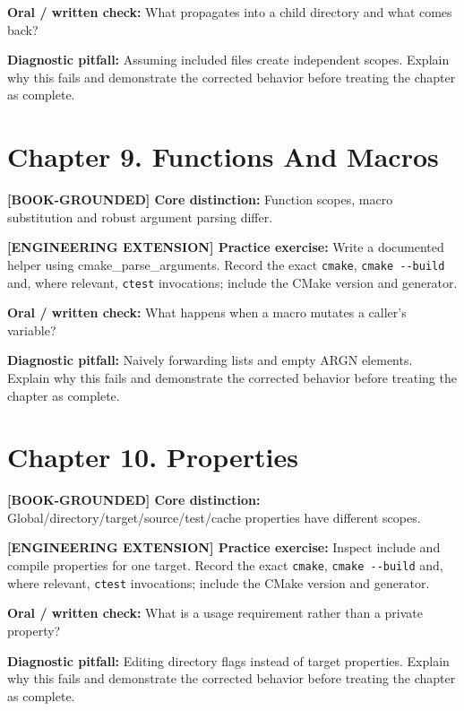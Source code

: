 \documentclass[11pt,letterpaper,oneside]{report}
\providecommand{\passthrough}[1]{#1}
\begin{document}
\textbf{Oral / written check:} What propagates into a child directory
and what comes back?

\textbf{Diagnostic pitfall:} Assuming included files create independent
scopes. Explain why this fails and demonstrate the corrected behavior
before treating the chapter as complete.

\section{Chapter 9. Functions And
Macros}\label{chapter-9.-functions-and-macros}

\textbf{{[}BOOK-GROUNDED{]} Core distinction:} Function scopes, macro
substitution and robust argument parsing differ.

\textbf{{[}ENGINEERING EXTENSION{]} Practice exercise:} Write a
documented helper using cmake\_parse\_arguments. Record the exact
\passthrough{\lstinline!cmake!}, \passthrough{\lstinline!cmake --build!}
and, where relevant, \passthrough{\lstinline!ctest!} invocations;
include the CMake version and generator.

\textbf{Oral / written check:} What happens when a macro mutates a
caller's variable?

\textbf{Diagnostic pitfall:} Naively forwarding lists and empty ARGN
elements. Explain why this fails and demonstrate the corrected behavior
before treating the chapter as complete.

\section{Chapter 10. Properties}\label{chapter-10.-properties}

\textbf{{[}BOOK-GROUNDED{]} Core distinction:}
Global/directory/target/source/test/cache properties have different
scopes.

\textbf{{[}ENGINEERING EXTENSION{]} Practice exercise:} Inspect include
and compile properties for one target. Record the exact
\passthrough{\lstinline!cmake!}, \passthrough{\lstinline!cmake --build!}
and, where relevant, \passthrough{\lstinline!ctest!} invocations;
include the CMake version and generator.

\textbf{Oral / written check:} What is a usage requirement rather than a
private property?

\textbf{Diagnostic pitfall:} Editing directory flags instead of target
properties. Explain why this fails and demonstrate the corrected
behavior before treating the chapter as complete.
\end{document}
